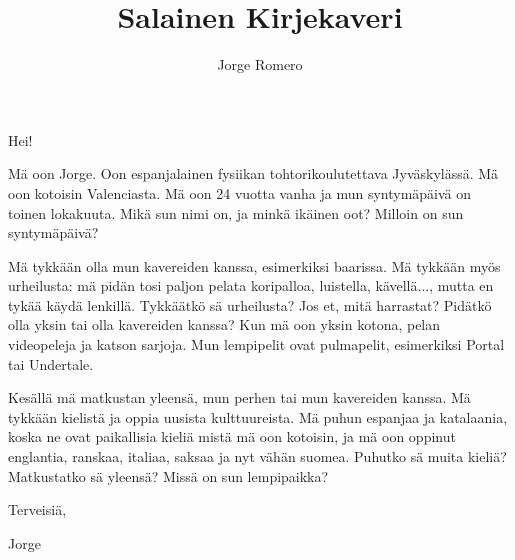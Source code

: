 

\title{Salainen Kirjekaveri}
\author{Jorge Romero}


\thispagestyle{empty}

Hei!

Mä oon Jorge. Oon espanjalainen fysiikan tohtorikoulutettava Jyväskylässä. Mä oon kotoisin Valenciasta. Mä oon 24 vuotta vanha ja mun syntymäpäivä on toinen lokakuuta. Mikä sun nimi on, ja minkä ikäinen oot? Milloin on sun syntymäpäivä? 

Mä tykkään olla mun kavereiden kanssa, esimerkiksi baarissa. Mä tykkään myös urheilusta: mä pidän tosi paljon pelata koripalloa, luistella, kävellä..., mutta en tykää käydä lenkillä. Tykkäätkö sä urheilusta? Jos et, mitä harrastat? Pidätkö olla yksin tai olla kavereiden kanssa? Kun mä oon yksin kotona, pelan videopeleja ja katson sarjoja. Mun lempipelit ovat pulmapelit, esimerkiksi Portal tai Undertale.

Kesällä mä matkustan yleensä, mun perhen tai mun kavereiden kanssa. Mä tykkään kielistä ja oppia  uusista kulttuureista. Mä puhun espanjaa ja katalaania, koska ne ovat paikallisia kieliä mistä mä oon kotoisin, ja mä oon oppinut englantia, ranskaa, italiaa, saksaa ja nyt vähän suomea. Puhutko sä muita kieliä? Matkustatko sä yleensä? Missä on sun lempipaikka? 

Terveisiä,

Jorge




